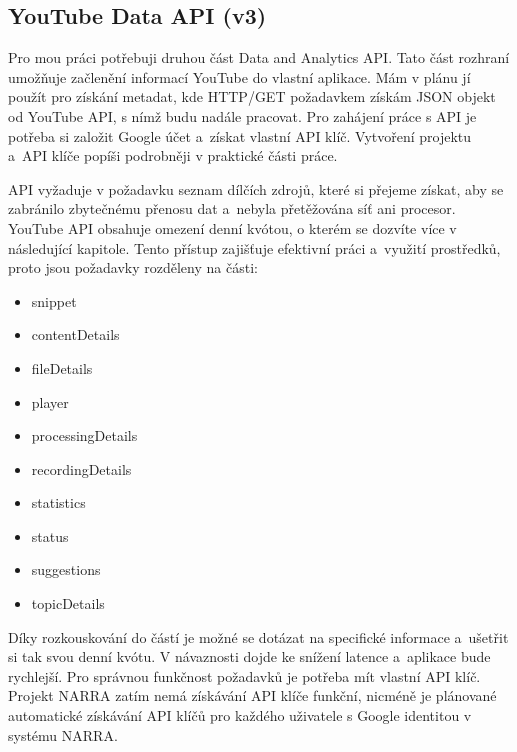 \subsection{YouTube Data API (v3)}
\par Pro mou práci potřebuji druhou část Data and Analytics API\cite{apistart}\cite{apiv3}. Tato část rozhraní umožňuje začlenění informací YouTube do vlastní aplikace. Mám v plánu jí použít pro získání metadat, kde HTTP/GET požadavkem získám JSON objekt od YouTube API, s nímž budu nadále pracovat. Pro zahájení práce s API je potřeba si založit Google účet a~získat vlastní API klíč. Vytvoření projektu a~API klíče popíši podrobněji v praktické části práce.
\par 
\par API vyžaduje v požadavku seznam dílčích zdrojů, které si přejeme získat, aby se zabránilo zbytečnému přenosu dat a~nebyla přetěžována síť ani procesor. YouTube API obsahuje omezení denní kvótou, o kterém se dozvíte více v následující kapitole. Tento přístup zajišťuje efektivní práci a~využití prostředků, proto jsou požadavky rozděleny na části:
\begin{itemize} 
\item{snippet}
\item{contentDetails}
\item{fileDetails}
\item{player}
\item{processingDetails}
\item{recordingDetails}
\item{statistics}
\item{status}
\item{suggestions}
\item{topicDetails}
\end{itemize}
\par Díky rozkouskování do částí je možné se dotázat na specifické informace a~ušetřit si tak svou denní kvótu. V návaznosti dojde ke snížení latence a~aplikace bude rychlejší. Pro správnou funkčnost požadavků je potřeba mít vlastní API klíč. Projekt NARRA zatím nemá získávání API klíče funkční, nicméně je plánované automatické získávání API klíčů pro každého uživatele s Google identitou v systému NARRA.

